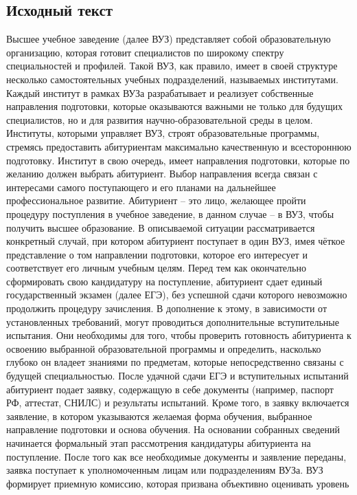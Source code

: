 \documentclass[areasetadvanced]{scrartcl}
\begin{document}
\subsection{Исходный текст}
Высшее учебное заведение (далее ВУЗ) представляет собой образовательную организацию,
которая готовит специалистов по широкому спектру специальностей и профилей. Такой
ВУЗ, как правило, имеет в своей структуре несколько самостоятельных учебных
подразделений, называемых институтами. Каждый институт в рамках ВУЗа разрабатывает и
реализует собственные направления подготовки, которые оказываются важными не только
для будущих специалистов, но и для развития научно-образовательной среды в целом.
Институты, которыми управляет ВУЗ, строят образовательные программы, стремясь
предоставить абитуриентам максимально качественную и всестороннюю подготовку.
Институт в свою очередь, имеет направления подготовки, которые по желанию должен
выбрать абитуриент. Выбор направления всегда связан с интересами самого поступающего и
его планами на дальнейшее профессиональное развитие. Абитуриент – это лицо, желающее
пройти процедуру поступления в учебное заведение, в данном случае – в ВУЗ, чтобы
получить высшее образование. В описываемой ситуации рассматривается конкретный
случай, при котором абитуриент поступает в один ВУЗ, имея чёткое представление о том
направлении подготовки, которое его интересует и соответствует его личным учебным
целям.
Перед тем как окончательно сформировать свою кандидатуру на поступление, абитуриент
сдает единый государственный экзамен (далее ЕГЭ), без успешной сдачи которого
невозможно продолжить процедуру зачисления. В дополнение к этому, в зависимости от
установленных требований, могут проводиться дополнительные вступительные испытания.
Они необходимы для того, чтобы проверить готовность абитуриента к освоению выбранной
образовательной программы и определить, насколько глубоко он владеет знаниями по
предметам, которые непосредственно связаны с будущей специальностью. После удачной
сдачи ЕГЭ и вступительных испытаний абитуриент подает заявку, содержащую в себе
документы (например, паспорт РФ, аттестат, СНИЛС) и результаты испытаний. Кроме того,
в заявку включается заявление, в котором указываются желаемая форма обучения,
выбранное направление подготовки и основа обучения.
На основании собранных сведений начинается формальный этап рассмотрения кандидатуры
абитуриента на поступление. После того как все необходимые документы и заявление
переданы, заявка поступает к уполномоченным лицам или подразделениям ВУЗа. ВУЗ
формирует приемную комиссию, которая призвана объективно оценивать уровень
\end{document}
